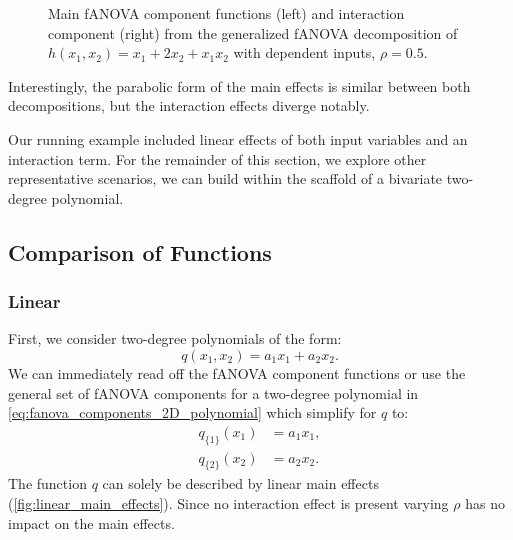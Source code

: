 \begin{figure}[htpb]
\begin{subfigure}[t]{0.49\textwidth}
    \end{subfigure}
    \caption{Main fANOVA component functions (left) and interaction component (right) from the generalized fANOVA decomposition of $h(x_1, x_2) = x_1 + 2 x_2 + x_1 x_2$ with dependent inputs, $\rho = 0.5$.}
    \label{fig:running_ex_dependent}
\end{figure}
Interestingly, the parabolic form of the main effects is similar between both decompositions, but the interaction effects diverge notably.\par
Our running example included linear effects of both input variables and an interaction term. For the remainder of this section, we explore other representative scenarios, we can build within the scaffold of a bivariate two-degree polynomial.

\subsection{Comparison of Functions}
\subsubsection{Linear}
First, we consider two-degree polynomials of the form:
$$q(x_1, x_2) = a_1 x_1 + a_2 x_2.$$
We can immediately read off the fANOVA component functions or use the general set of fANOVA components for a two-degree polynomial in \autoref{eq:fanova_components_2D_polynomial} which simplify for $q$ to:
\begin{align*}
    q_{\{1\}}(x_1) &= a_1 x_1, \\
    q_{\{2\}}(x_2) &= a_2 x_2.
\end{align*}
The function $q$ can solely be described by linear main effects (\autoref{fig:linear_main_effects}). Since no interaction effect is present varying $\rho$ has no impact on the main effects.

